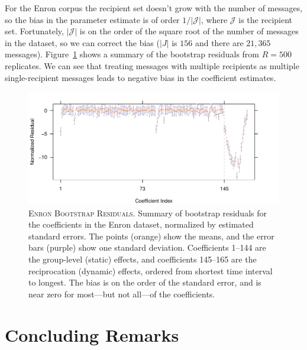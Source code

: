 \documentclass[aoas,preprint]{imsart}
\begin{document}
For the Enron corpus the recipient set doesn't grow with the number
of messages, so the bias in the parameter estimate is of order
$1/|\mathcal{J}|$, where $\mathcal{J}$ is the recipient set.  Fortunately,
$|\mathcal{J}|$ is on the order of the square root of the number of messages
in the dataset, so we can correct the bias ($|J|$ is $156$ and there are
$21,365$ messages).  Figure~\ref{F:boot-resid} shows a summary of the bootstrap
residuals from $R = 500$ replicates.  We can see that treating messages with
multiple recipients as multiple single-recipient messages leads to negative
bias in the coefficient estimates.

\begin{figure}
    \includegraphics[scale=0.6]{figures/boot-resid}
    \caption{
        \textsc{Enron Bootstrap Residuals.} Summary of bootstrap residuals for
        the coefficients in the Enron dataset, normalized by estimated
        standard errors.  The points (orange) show the means, and the
        error bars (purple) show one standard deviation.  Coefficients
        1--144 are the group-level (static) effects, and coefficients
        145--165 are the reciprocation (dynamic) effects, ordered from
        shortest time interval to longest.  The bias is on the order of
        the standard error, and is near zero for most---but not all---of the
        coefficients.
    }
    \label{F:boot-resid}
\end{figure}


\section{Concluding Remarks}
\end{document}
